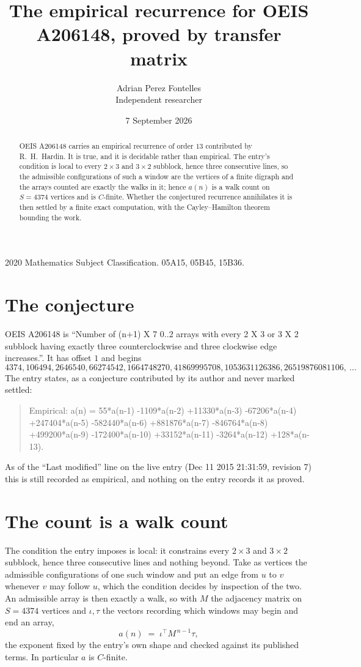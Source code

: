 \documentclass[11pt,a4paper]{article}
\title{The empirical recurrence for OEIS A206148, proved by transfer matrix}
\author{Adrian Perez Fontelles\\ \small Independent researcher}
\date{7 September 2026}
\theoremstyle{plain}
\theoremstyle{definition}
\begin{document}
\maketitle

\begin{abstract}
OEIS A206148 carries an empirical recurrence of order $13$ contributed by R.~H.~Hardin. It is
true, and it is decidable rather than empirical. The entry's condition is local to every $2\times3$ and $3\times2$ subblock, hence three consecutive lines, so
the admissible configurations of such a window are the vertices of a finite digraph and the
arrays counted are exactly the walks in it; hence $a(n)$ is a walk count on $S=4374$ vertices
and is $C$-finite. Whether the conjectured recurrence annihilates it is then settled by a
finite exact computation, with the Cayley--Hamilton theorem bounding the work.
\end{abstract}

\noindent\small 2020 Mathematics Subject Classification. 05A15, 05B45, 15B36.\normalsize

\section{The conjecture}

OEIS A206148 is ``Number of (n+1) X 7 0..2 arrays with every 2 X 3 or 3 X 2 subblock having exactly three counterclockwise and three clockwise edge increases.''. It has offset $1$ and begins
\[
4374, 106494, 2646540, 66274542, 1664748270, 41869995708, 1053631126386, 26519876081106,\ \dots
\]
The entry states, as a conjecture contributed by its author and never marked settled:
\begin{quote}
Empirical: a(n) = 55*a(n-1) -1109*a(n-2) +11330*a(n-3) -67206*a(n-4) +247404*a(n-5) -582440*a(n-6) +881876*a(n-7) -846764*a(n-8) +499200*a(n-9) -172400*a(n-10) +33152*a(n-11) -3264*a(n-12) +128*a(n-13).
\end{quote}
As of the ``Last modified'' line on the live entry (Dec 11 2015 21:31:59, revision 7) this is still
recorded as empirical, and nothing on the entry records it as proved.

\section{The count is a walk count}

The condition the entry imposes is local: it constrains every $2\times3$ and $3\times2$ subblock, hence three consecutive lines and nothing beyond. Take as
vertices the admissible configurations of one such window and put an edge from $u$ to $v$
whenever $v$ may follow $u$, which the condition decides by inspection of the two. An
admissible array is then exactly a walk, so with $M$ the adjacency matrix on $S=4374$ vertices
and $\iota,\tau$ the vectors recording which windows may begin and end an array,
\[
a(n)\;=\;\iota^{\!\top}M^{\,n-1}\tau ,
\]
the exponent fixed by the entry's own shape and checked against its published terms. In
particular $a$ is $C$-finite.
\end{document}

